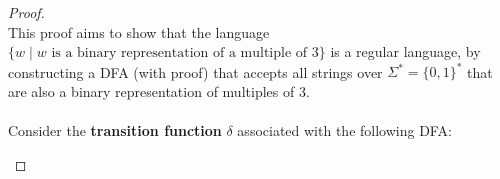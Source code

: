 \documentclass[12pt]{article}
\begin{document}
\begin{proof}
\leavevmode\\
    This proof aims to show that the language $\{ w \mid w \text{ is a binary representation of a multiple of 3} \}$ is a regular language, by constructing a DFA (with proof) that accepts all strings over $\Sigma^* = \{0, 1\}^*$ that are also a binary representation of multiples of $3$. \\
    \\
    Consider the \textbf{transition function} $\delta$ associated with the following DFA:
    \begin{center}
\end{center}
\end{proof}
\end{document}
